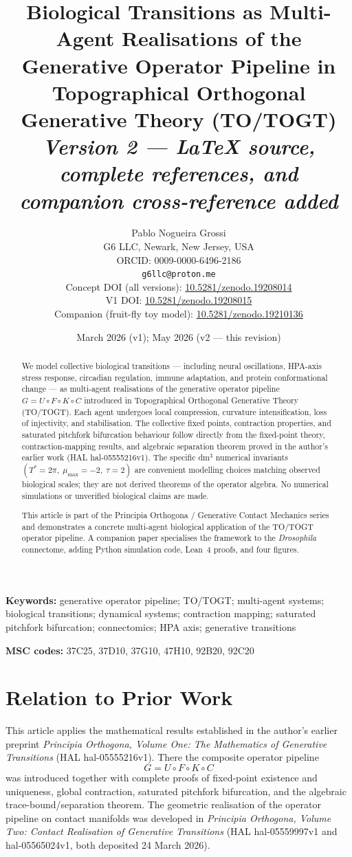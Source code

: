 \documentclass[12pt,a4paper]{article}
\title{%
  \textbf{Biological Transitions as Multi-Agent Realisations of the}\\
  \textbf{Generative Operator Pipeline in Topographical Orthogonal}\\
  \textbf{Generative Theory (TO/TOGT)}\\[0.5em]
  \large\emph{Version 2 --- LaTeX source, complete references, and
  companion cross-reference added}%
}
\author{%
  Pablo Nogueira Grossi\\
  G6 LLC, Newark, New Jersey, USA\\
  ORCID: 0009-0000-6496-2186\\
  \texttt{g6llc@proton.me}\\[0.3em]
  \small Concept DOI (all versions):
    \href{https://doi.org/10.5281/zenodo.19208014}{10.5281/zenodo.19208014}\\
  \small V1 DOI:
    \href{https://doi.org/10.5281/zenodo.19208015}{10.5281/zenodo.19208015}\\
  \small Companion (fruit-fly toy model):
    \href{https://doi.org/10.5281/zenodo.19210136}{10.5281/zenodo.19210136}
}
\date{March 2026 (v1); May 2026 (v2 --- this revision)}
\begin{document}
\maketitle

\begin{abstract}
We model collective biological transitions --- including neural
oscillations, HPA-axis stress response, circadian regulation, immune
adaptation, and protein conformational change --- as multi-agent
realisations of the generative operator pipeline
$G = U \circ F \circ K \circ C$ introduced in Topographical Orthogonal
Generative Theory (TO/TOGT). Each agent undergoes local compression,
curvature intensification, loss of injectivity, and stabilisation.
The collective fixed points, contraction properties, and saturated
pitchfork bifurcation behaviour follow directly from the fixed-point
theory, contraction-mapping results, and algebraic separation theorem
proved in the author's earlier work \cite{Grossi2026_Vol1}
(HAL hal-05555216v1). The specific dm$^3$ numerical invariants
$(T^{*}=2\pi,\;\mu_{\max}=-2,\;\tau=2)$ are convenient modelling
choices matching observed biological scales; they are not derived
theorems of the operator algebra. No numerical simulations or
unverified biological claims are made.

This article is part of the Principia Orthogona / Generative Contact
Mechanics series and demonstrates a concrete multi-agent biological
application of the TO/TOGT operator pipeline. A companion paper
\cite{Grossi2026_FruitFly} specialises the framework to the
\textit{Drosophila} connectome, adding Python simulation code, Lean~4
proofs, and four figures.
\end{abstract}

\noindent\textbf{Keywords:} generative operator pipeline; TO/TOGT;
multi-agent systems; biological transitions; dynamical systems;
contraction mapping; saturated pitchfork bifurcation; connectomics;
HPA axis; generative transitions

\noindent\textbf{MSC codes:} 37C25, 37D10, 37G10, 47H10, 92B20, 92C20

\section{Relation to Prior Work}
\label{sec:prior}

This article applies the mathematical results established in the
author's earlier preprint \textit{Principia Orthogona, Volume One:
The Mathematics of Generative Transitions}
\cite{Grossi2026_Vol1} (HAL hal-05555216v1). There the composite
operator pipeline
\[
  G = U \circ F \circ K \circ C
\]
was introduced together with complete proofs of fixed-point existence
and uniqueness, global contraction, saturated pitchfork bifurcation,
and the algebraic trace-bound/separation theorem. The geometric
realisation of the operator pipeline on contact manifolds was developed
in \textit{Principia Orthogona, Volume Two: Contact Realisation of
Generative Transitions} \cite{Grossi2026_Vol2}
(HAL hal-05559997v1 and hal-05565024v1, both deposited 24 March 2026).
\end{document}
